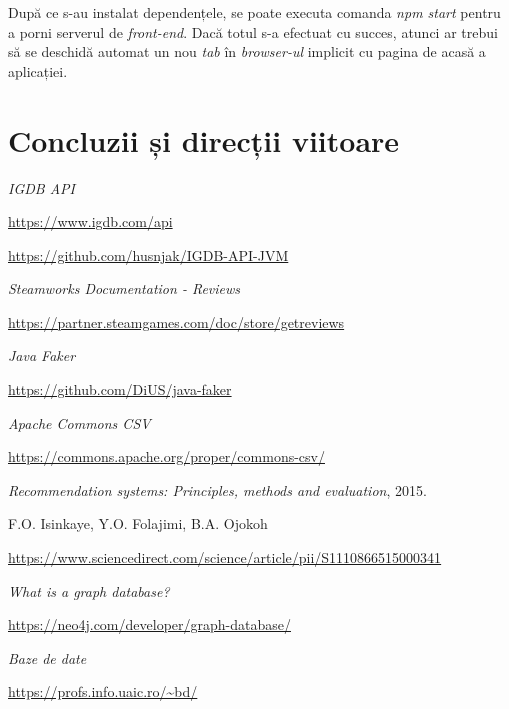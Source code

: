 \documentclass[12pt,a4paper]{report}
\begin{document}
După ce s-au instalat dependențele, se poate executa comanda \emph{npm start} pentru a porni serverul de \emph{front-end}. Dacă totul s-a efectuat cu succes, atunci ar trebui să se deschidă automat un nou \emph{tab} în \emph{browser-ul} implicit cu pagina de acasă a aplicației.


\section{Concluzii și direcții viitoare}



\renewcommand\bibname{Bibliografie}
\begin{thebibliography}{9}

  
  \textit{IGDB API}
  
  \url{https://www.igdb.com/api}
  
  \url{https://github.com/husnjak/IGDB-API-JVM}
  
  
  \textit{Steamworks Documentation - Reviews}
  
  \url{https://partner.steamgames.com/doc/store/getreviews}
  
  
  \textit{Java Faker}
  
  \url{https://github.com/DiUS/java-faker}
  
  
  \textit{Apache Commons CSV}
  
  \url{https://commons.apache.org/proper/commons-csv/}


  
  \textit{Recommendation systems: Principles, methods and evaluation},
  2015.
  
  F.O. Isinkaye, Y.O. Folajimi, B.A. Ojokoh
  
  \url{https://www.sciencedirect.com/science/article/pii/S1110866515000341}
  
  
  \textit{What is a graph database?}
  
  \url{https://neo4j.com/developer/graph-database/}
  
  
  \textit{Baze de date}
  
  \url{https://profs.info.uaic.ro/~bd/}
  
  

\end{thebibliography}
\end{document}
